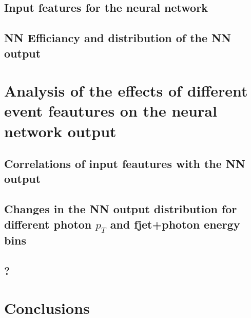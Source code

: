 \section{Input features for the neural network}
\section{NN Efficiancy and distribution of the NN output}
\chapter{Analysis of the effects of different event feautures on the neural network output}
\section{Correlations of input feautures with the NN output}
\section{Changes in the NN output distribution for different photon \texorpdfstring{$p_T$}{TEXT} and fjet+photon energy bins}
\section{?}
\chapter{Conclusions}

